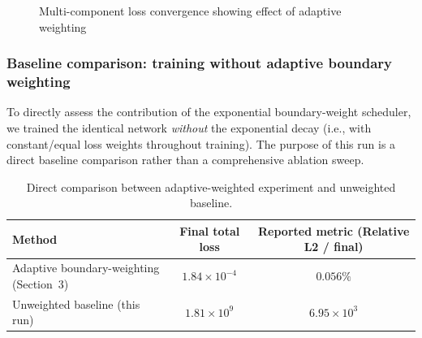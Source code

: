 \documentclass[twocolumn]{svjour3}
\begin{document}
	\begin{figure}[htbp]
		\centering
		\caption{Multi-component loss convergence showing effect of adaptive weighting}\label{fig:point_convergence}
	\end{figure}



	\subsubsection{Baseline comparison: training without adaptive boundary weighting}
	\label{sec:baseline_unweighted}
	
	To directly assess the contribution of the exponential boundary-weight scheduler, we trained the identical network \emph{without} the exponential decay (i.e., with constant/equal loss weights throughout training). The purpose of this run is a direct baseline comparison rather than a comprehensive ablation sweep.
	
	\begin{table}[t]
	    \centering
	    \caption{Direct comparison between adaptive-weighted experiment and unweighted baseline.}
	    \label{tab:baseline_compare}
	    \small
	    \setlength{\tabcolsep}{6pt}
	    \begin{tabular}{@{}l c c@{}}
	        \toprule
	        Method & Final total loss & Reported metric (Relative L2 / final) \\
	        \midrule
	        Adaptive boundary-weighting (Section~3) & $1.84\times10^{-4}$ & $0.056\%$ \\
	        Unweighted baseline (this run) & $1.81\times10^{9}$ & $6.95\times10^{3}$ \\
	        \bottomrule
	    \end{tabular}
	\end{table}
	
\end{document}
